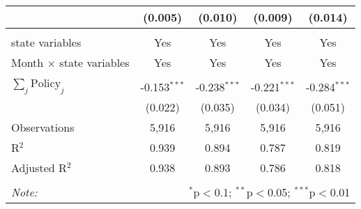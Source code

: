 \begin{tabular}{@{\extracolsep{1pt}}lcccc}
  & (0.005) & (0.010) & (0.009) & (0.014) \\ 
 \hline \\[-1.8ex] 
state variables & Yes & Yes & Yes & Yes \\ 
Month $\times$ state variables & Yes & Yes & Yes & Yes \\ 
\hline \\[-1.8ex] 
$\sum_j \mathrm{Policy}_j$ & -0.153$^{***}$ & -0.238$^{***}$ & -0.221$^{***}$ & -0.284$^{***}$ \\ 
 & (0.022) & (0.035) & (0.034) & (0.051) \\ 
Observations & 5,916 & 5,916 & 5,916 & 5,916 \\ 
R$^{2}$ & 0.939 & 0.894 & 0.787 & 0.819 \\ 
Adjusted R$^{2}$ & 0.938 & 0.893 & 0.786 & 0.818 \\ 
\hline 
\hline \\[-1.8ex] 
\textit{Note:}  & \multicolumn{4}{r}{$^{*}$p$<$0.1; $^{**}$p$<$0.05; $^{***}$p$<$0.01} \\ 
\end{tabular} 